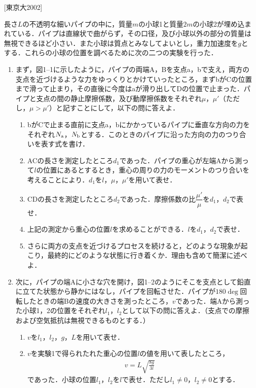 

\noindent
{} [東京大2002]


長さ$L$の不透明な細いパイプの中に，質量$m$の小球1と質量$2m$の小球2が埋め込まれている．パイプは直線状で曲がらず，その口径，及び小球以外の部分の質量は無視できるほど小さい．また小球は質点とみなしてよいとし，重力加速度を$g$とする．これらの小球の位置を調べるために次の二つの実験を行った．

\begin{enumerate}[I]
  \item {\hzw}まず，図1--1に示したように，パイプの両端A，Bを支点a，bで支え，両方の支点を近づけるような力をゆっくりとかけていったところ，まずbがCの位置まで滑って止まり，その直後に今度はaが滑り出してDの位置で止まった．パイプと支点の間の静止摩擦係数，及び動摩擦係数をそれぞれ$\mu$，$\mu'$（ただし，$\mu > \mu'$）と記すことにして，以下の問に答えよ．
  \begin{enumerate}[(1)]
    \item {\hzw}bがCで止まる直前に支点a，bにかかっているパイプに垂直な方向の力をそれぞれ$N_\mathrm{a}$，$N_\mathrm{b}$とする．このときのパイプに沿った方向の力のつり合いを表す式を書け．
    \item {\hzw}ACの長さを測定したところ$d_1$であった．パイプの重心が左端Aから測って$l$の位置にあるとするとき，重心の周りの力のモーメントのつり合いを考えることにより．$d_1$を$l$，$\mu$，$\mu'$を用いて表せ．
    \item {\hzw}CDの長さを測定したところ$d_2$であった．摩擦係数の比$\dfrac{\mu'}{\mu}$を$d_1$，$d_2$で表せ．
    \item {\hzw}上記の測定から重心の位置$l$を求めることができる．$l$を$d_1$，$d_2$で表せ．
    \item {\hzw}さらに両方の支点を近づけるプロセスを続けると，どのような現象が起こり，最終的にどのような状態に行き着くか．理由も含めて簡潔に述べよ．
  \end{enumerate}
  \item {\hzw}次に，パイプの端Aに小さな穴を開け，図1--2のようにそこを支点として鉛直に立てた状態から静かにはなし，パイプを回転させた．パイプが$180\deg$回転したときの端Bの速度の大きさを測ったところ，$v$であった．端Aから測った小球1，2の位置をそれぞれ$l_1$，$l_2$として以下の問に答えよ．（支点での摩擦および空気抵抗は無視できるものとする．）
  \begin{enumerate}[(1)]
    \item {\hzw}$v$を$l_1$，$l_2$，$g$，$L$を用いて表せ．
    \item {\hzw}$v$を実験1で得られたれた重心の位置$l$の値を用いて表したところ，
    \begin{gather*}
      v = L \sqrt{\frac{8g}{3l}}
    \end{gather*}
    であった．小球の位置$l_1$，$l_2$を$l$で表せ．ただし$l_1 \neq 0$，$l_2 \neq 0$とする．
  \end{enumerate}
\end{enumerate}
